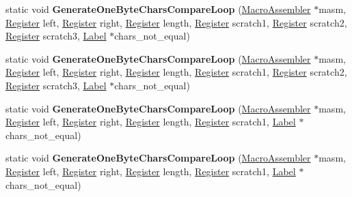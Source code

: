 \begin{DoxyCompactItemize}
\item 
static void {\bfseries Generate\+One\+Byte\+Chars\+Compare\+Loop} (\hyperlink{classv8_1_1internal_1_1_macro_assembler}{Macro\+Assembler} $\ast$masm, \hyperlink{structv8_1_1internal_1_1_register}{Register} left, \hyperlink{structv8_1_1internal_1_1_register}{Register} right, \hyperlink{structv8_1_1internal_1_1_register}{Register} length, \hyperlink{structv8_1_1internal_1_1_register}{Register} scratch1, \hyperlink{structv8_1_1internal_1_1_register}{Register} scratch2, \hyperlink{structv8_1_1internal_1_1_register}{Register} scratch3, \hyperlink{classv8_1_1internal_1_1_label}{Label} $\ast$chars\+\_\+not\+\_\+equal)\hypertarget{classv8_1_1internal_1_1_string_helper_af2f4642aff952c33bb369efeb4fc336b}{}\label{classv8_1_1internal_1_1_string_helper_af2f4642aff952c33bb369efeb4fc336b}

\item 
static void {\bfseries Generate\+One\+Byte\+Chars\+Compare\+Loop} (\hyperlink{classv8_1_1internal_1_1_macro_assembler}{Macro\+Assembler} $\ast$masm, \hyperlink{structv8_1_1internal_1_1_register}{Register} left, \hyperlink{structv8_1_1internal_1_1_register}{Register} right, \hyperlink{structv8_1_1internal_1_1_register}{Register} length, \hyperlink{structv8_1_1internal_1_1_register}{Register} scratch1, \hyperlink{structv8_1_1internal_1_1_register}{Register} scratch2, \hyperlink{structv8_1_1internal_1_1_register}{Register} scratch3, \hyperlink{classv8_1_1internal_1_1_label}{Label} $\ast$chars\+\_\+not\+\_\+equal)\hypertarget{classv8_1_1internal_1_1_string_helper_af2f4642aff952c33bb369efeb4fc336b}{}\label{classv8_1_1internal_1_1_string_helper_af2f4642aff952c33bb369efeb4fc336b}

\item 
static void {\bfseries Generate\+One\+Byte\+Chars\+Compare\+Loop} (\hyperlink{classv8_1_1internal_1_1_macro_assembler}{Macro\+Assembler} $\ast$masm, \hyperlink{structv8_1_1internal_1_1_register}{Register} left, \hyperlink{structv8_1_1internal_1_1_register}{Register} right, \hyperlink{structv8_1_1internal_1_1_register}{Register} length, \hyperlink{structv8_1_1internal_1_1_register}{Register} scratch1, \hyperlink{classv8_1_1internal_1_1_label}{Label} $\ast$chars\+\_\+not\+\_\+equal)\hypertarget{classv8_1_1internal_1_1_string_helper_aefc5eb4eed17763a075ef83ab3d8325f}{}\label{classv8_1_1internal_1_1_string_helper_aefc5eb4eed17763a075ef83ab3d8325f}

\item 
static void {\bfseries Generate\+One\+Byte\+Chars\+Compare\+Loop} (\hyperlink{classv8_1_1internal_1_1_macro_assembler}{Macro\+Assembler} $\ast$masm, \hyperlink{structv8_1_1internal_1_1_register}{Register} left, \hyperlink{structv8_1_1internal_1_1_register}{Register} right, \hyperlink{structv8_1_1internal_1_1_register}{Register} length, \hyperlink{structv8_1_1internal_1_1_register}{Register} scratch1, \hyperlink{classv8_1_1internal_1_1_label}{Label} $\ast$chars\+\_\+not\+\_\+equal)\hypertarget{classv8_1_1internal_1_1_string_helper_aefc5eb4eed17763a075ef83ab3d8325f}{}\label{classv8_1_1internal_1_1_string_helper_aefc5eb4eed17763a075ef83ab3d8325f}


\end{DoxyCompactItemize}
